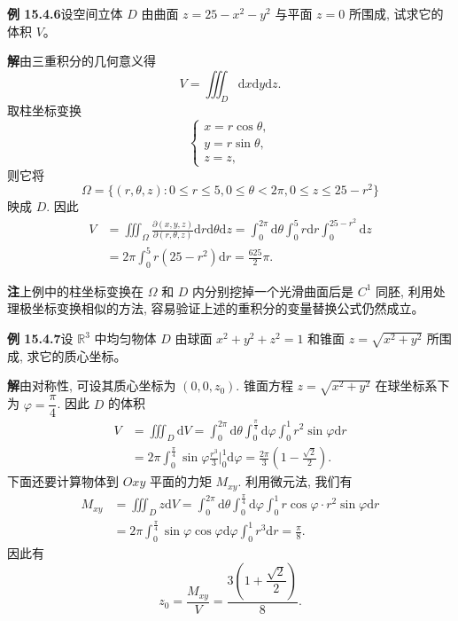\documentclass[UTF8,12pt,a4paper,fontset=fandol]{ctexart}
\begin{document}
\noindent\textbf{例 15.4.6}\quad 设空间立体 $D$ 由曲面 $z=25-x^2-y^2$ 与平面 $z=0$ 所围成, 试求它的体积 $V$。

\noindent\textbf{解}\quad 由三重积分的几何意义得
\[
  V=\iiint_D\mathrm dx\mathrm dy\mathrm dz.
\]
取柱坐标变换
\[
  \begin{cases}
    x=r\cos\theta,\\
    y=r\sin\theta,\\
    z=z,
  \end{cases}
\]
则它将
\[
  \Omega=\{(r,\theta,z):0\leqslant r\leqslant5,0\leqslant\theta<2\pi,0\leqslant z\leqslant25-r^2\}
\]
映成 $D$. 因此
\[
\begin{aligned}
  V&=\iiint_\Omega\frac{\partial(x,y,z)}{\partial(r,\theta,z)}
  \mathrm dr\mathrm d\theta\mathrm dz
  =\int_0^{2\pi}\mathrm d\theta\int_0^5 r\mathrm dr\int_0^{25-r^2}\mathrm dz\\
  &=2\pi\int_0^5 r(25-r^2)\mathrm dr=\frac{625}2\pi.
\end{aligned}
\]

\noindent\textbf{注}\quad 上例中的柱坐标变换在 $\Omega$ 和 $D$ 内分别挖掉一个光滑曲面后是 $C^1$ 同胚, 利用处理极坐标变换相似的方法, 容易验证上述的重积分的变量替换公式仍然成立。

\noindent\textbf{例 15.4.7}\quad 设 $\mathbb R^3$ 中均匀物体 $D$ 由球面 $x^2+y^2+z^2=1$ 和锥面 $z=\sqrt{x^2+y^2}$ 所围成, 求它的质心坐标。

\noindent\textbf{解}\quad 由对称性, 可设其质心坐标为 $(0,0,z_0)$. 锥面方程 $z=\sqrt{x^2+y^2}$ 在球坐标系下为 $\varphi=\dfrac\pi4$. 因此 $D$ 的体积
\[
\begin{aligned}
  V&=\iiint_D\mathrm dV
  =\int_0^{2\pi}\mathrm d\theta\int_0^{\frac\pi4}\mathrm d\varphi\int_0^1 r^2\sin\varphi\mathrm dr\\
  &=2\pi\int_0^{\frac\pi4}\sin\varphi\frac{r^3}3\Big|_0^1\mathrm d\varphi
  =\frac{2\pi}3\left(1-\frac{\sqrt2}2\right).
\end{aligned}
\]
下面还要计算物体到 $Oxy$ 平面的力矩 $M_{xy}$. 利用微元法, 我们有
\[
\begin{aligned}
  M_{xy}&=\iiint_D z\mathrm dV
  =\int_0^{2\pi}\mathrm d\theta\int_0^{\frac\pi4}\mathrm d\varphi\int_0^1
  r\cos\varphi\cdot r^2\sin\varphi\mathrm dr\\
  &=2\pi\int_0^{\frac\pi4}\sin\varphi\cos\varphi\mathrm d\varphi\int_0^1r^3\mathrm dr
  =\frac\pi8.
\end{aligned}
\]
因此有
\[
  z_0=\frac{M_{xy}}V=\frac{3\left(1+\dfrac{\sqrt2}2\right)}8.
\]
\end{document}
